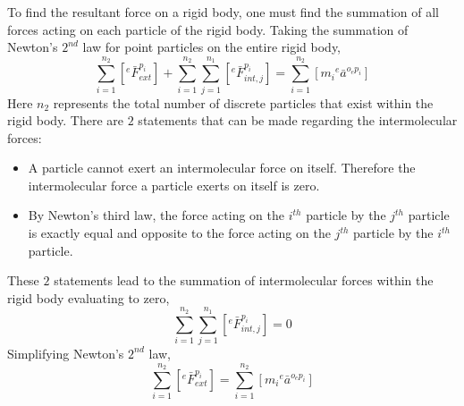 \documentclass[class=report, 12pt, crop=false]{standalone}
\begin{document}
\begin{center}
\\~\\To find the resultant force on a rigid body, one must find the summation of all forces acting on each particle of the rigid body. Taking the summation of Newton's $2^{nd}$ law for point particles on the entire rigid body,
$$\sum^{n_{2}}_{i = 1}\left[{}^{e}\bar{F}^{p_{i}}_{ext}\right] + \sum^{n_{2}}_{i = 1}\sum^{n_{1}}_{j = 1}\left[{}^{e}\bar{F}^{p_{i}}_{int,j}\right] = \sum^{n_{2}}_{i = 1}\left[m_{i}{}^{e}\bar{a}^{o_{e}p_{i}}\right]$$
Here $n_{2}$ represents the total number of discrete particles that exist within the rigid body. There are $2$ statements that can be made regarding the intermolecular forces:
\begin{itemize}
    \item A particle cannot exert an intermolecular force on itself. Therefore the intermolecular force a particle exerts on itself is zero.
    \item By Newton's third law, the force acting on the $i^{th}$ particle by the $j^{th}$ particle is exactly equal and opposite to the force acting on the $j^{th}$ particle by the $i^{th}$ particle.
\end{itemize}
These $2$ statements lead to the summation of intermolecular forces within the rigid body evaluating to zero,
$$\sum^{n_{2}}_{i = 1}\sum^{n_{1}}_{j = 1}\left[{}^{e}\bar{F}^{p_{i}}_{int,j}\right] = 0$$
Simplifying Newton's $2^{nd}$ law,
\begin{equation}\sum^{n_{2}}_{i = 1}\left[{}^{e}\bar{F}^{p_{i}}_{ext}\right] = \sum^{n_{2}}_{i = 1}\left[m_{i}{}^{e}\bar{a}^{o_{e}p_{i}}\right]\label{mambah-1}\end{equation}


\end{center}
\end{document}
